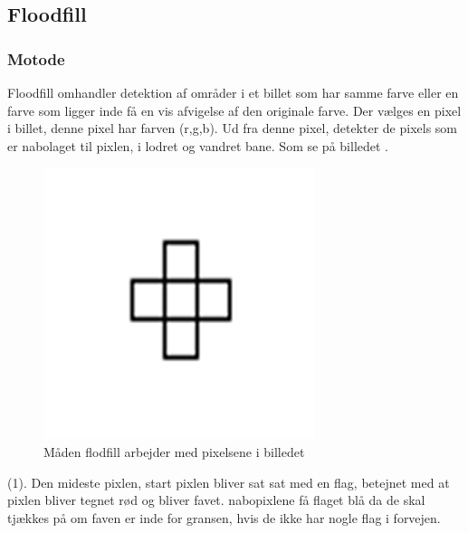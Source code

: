 \subsection*{Floodfill}

\subsubsection*{Motode}
Floodfill omhandler detektion af områder i et billet som har samme farve
eller en farve som ligger inde få en vis afvigelse af den originale
farve. Der vælges en pixel i billet, denne pixel har farven (r,g,b). Ud
fra denne pixel, detekter de pixels som er nabolaget til pixlen, i
lodret og vandret bane. Som se på billedet $\label{floodfill1}$.

\begin{figure}[h]
	\begin{center}
		\includegraphics[scale=0.42,angle=0]{afsnit/vores_implementation/billeder/flood_fill/floodfill1}
	\end{center}
	\caption[]{Måden flodfill arbejder med pixelsene i billedet}
	\label{floodfill1}
\end{figure}

(1). Den mideste pixlen, start pixlen bliver sat sat med en flag,
betejnet med at pixlen bliver tegnet rød og bliver favet. nabopixlene få
flaget blå da de skal tjækkes på om faven er inde for gransen, hvis de
ikke har nogle flag i forvejen.

